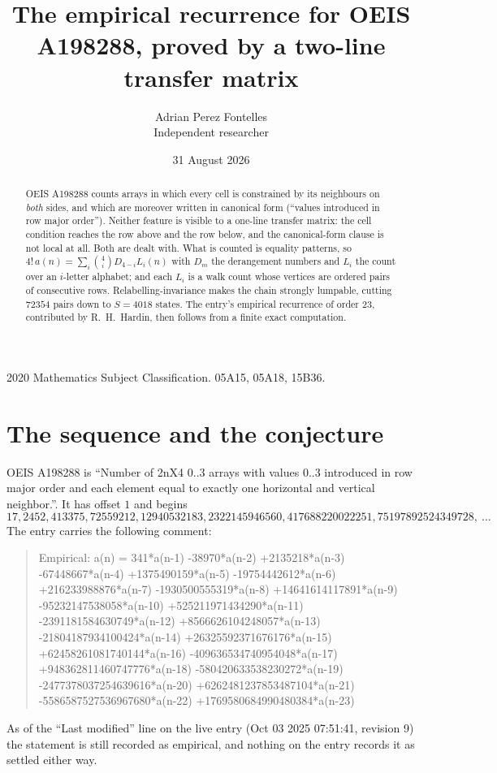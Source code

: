 \documentclass[11pt,a4paper]{article}
\title{The empirical recurrence for OEIS A198288, proved by a two-line transfer matrix}
\author{Adrian Perez Fontelles\\ \small Independent researcher}
\date{31 August 2026}
\theoremstyle{plain}
\theoremstyle{definition}
\begin{document}
\maketitle

\begin{abstract}
OEIS A198288 counts arrays in which every cell is constrained by its neighbours on \emph{both}
sides, and which are moreover written in canonical form (``values introduced in row major
order''). Neither feature is visible to a one-line transfer matrix: the cell condition
reaches the row above and the row below, and the canonical-form clause is not local at
all. Both are dealt with. What is counted is equality patterns, so
$4!\,a(n)=\sum_i\binom{4}{i}D_{4-i}L_i(n)$ with $D_m$ the derangement numbers and
$L_i$ the count over an $i$-letter alphabet; and each $L_i$ is a walk count whose vertices
are ordered pairs of consecutive rows. Relabelling-invariance makes the chain strongly
lumpable, cutting $72354$ pairs down to $S=4018$ states. The entry's empirical recurrence of
order $23$, contributed by R.~H.~Hardin, then follows from a finite exact computation.
\end{abstract}

\noindent\small 2020 Mathematics Subject Classification. 05A15, 05A18, 15B36.\normalsize

\section{The sequence and the conjecture}

OEIS A198288 is ``Number of 2nX4 0..3 arrays with values 0..3 introduced in row major order and each element equal to exactly one horizontal and vertical neighbor.''. It has offset $1$ and begins
\[
17, 2452, 413375, 72559212, 12940532183, 2322145946560, 417688220022251, 75197892524349728,\ \dots
\]
The entry carries the following comment:
\begin{quote}\small
Empirical: a(n) = 341*a(n-1) -38970*a(n-2) +2135218*a(n-3) -67448667*a(n-4) +1375490159*a(n-5) -19754442612*a(n-6) +216233988876*a(n-7) -1930500555319*a(n-8) +14641614117891*a(n-9) -95232147538058*a(n-10) +525211971434290*a(n-11) -2391181584630749*a(n-12) +8566626104248057*a(n-13) -21804187934100424*a(n-14) +26325592371676176*a(n-15) +62458261081740144*a(n-16) -409636534740954048*a(n-17) +948362811460747776*a(n-18) -580420633538230272*a(n-19) -2477378037254639616*a(n-20) +6262481237853487104*a(n-21) -5586587527536967680*a(n-22) +1769580684990480384*a(n-23)
\end{quote}
As of the ``Last modified'' line on the live entry (Oct 03 2025 07:51:41, revision 9) the statement is
still recorded as empirical, and nothing on the entry records it as settled either way.
\end{document}
